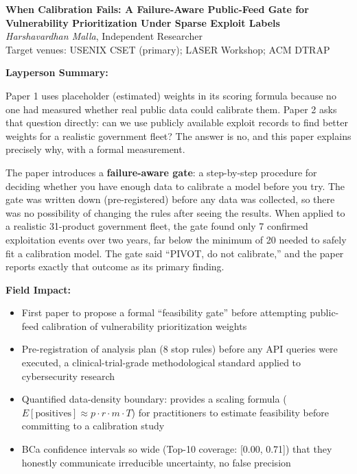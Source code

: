 \documentclass[12pt,letterpaper]{article}
\begin{document}
\begin{center}
  \textbf{\large When Calibration Fails: A Failure-Aware Public-Feed Gate for\\
  Vulnerability Prioritization Under Sparse Exploit Labels}\\[0.5em]
  \textit{Harshavardhan Malla}, Independent Researcher\\[0.5em]
  Target venues: USENIX CSET (primary); LASER Workshop; ACM DTRAP
\end{center}

\vspace{1em}
\noindent\textbf{Layperson Summary:}

Paper 1 uses placeholder (estimated) weights in its scoring formula because no
one had measured whether real public data could calibrate them. Paper 2 asks that
question directly: can we use publicly available exploit records to find better
weights for a realistic government fleet? The answer is no, and this paper
explains precisely why, with a formal measurement.

The paper introduces a \textbf{failure-aware gate}: a step-by-step procedure
for deciding whether you have enough data to calibrate a model before you try.
The gate was written down (pre-registered) before any data was collected, so
there was no possibility of changing the rules after seeing the results. When
applied to a realistic 31-product government fleet, the gate found only 7
confirmed exploitation events over two years, far below the minimum of 20
needed to safely fit a calibration model. The gate said ``PIVOT, do not
calibrate,'' and the paper reports exactly that outcome as its primary finding.

\vspace{0.5em}
\noindent\textbf{Field Impact:}
\begin{itemize}[leftmargin=*,itemsep=2pt]
  \item First paper to propose a formal ``feasibility gate'' before attempting
        public-feed calibration of vulnerability prioritization weights
  \item Pre-registration of analysis plan (8 stop rules) before any API queries
        were executed, a clinical-trial-grade methodological standard applied to
        cybersecurity research
  \item Quantified data-density boundary: provides a scaling formula
        ($E[\text{positives}] \approx p \cdot r \cdot m \cdot T$) for practitioners
        to estimate feasibility before committing to a calibration study
  \item BCa confidence intervals so wide (Top-10 coverage: [0.00, 0.71]) that
        they honestly communicate irreducible uncertainty, no false precision
\end{itemize}
\end{document}
